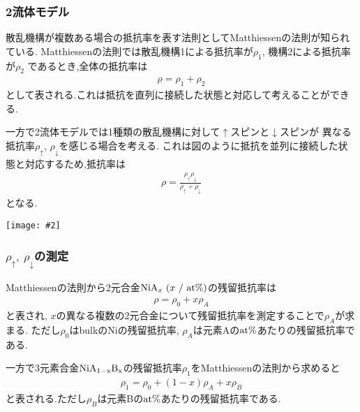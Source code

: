 \documentclass[uplatex,a4j,11pt,dvipdfmx]{jsarticle}
\makeatletter
\def\fgcaption{\def\@captype{figure}\caption}
\newcommand{\mfig}[3][width=15cm]{
\begin{center}
\texttt{[image: \#2]}
\fgcaption{#3 \label{fig:#2}}
\end{center}
}
\makeatother
\begin{document}
\subsubsection*{2流体モデル}
散乱機構が複数ある場合の抵抗率を表す法則としてMatthiessenの法則が知られている.
Matthiessenの法則では散乱機構1による抵抗率が$\rho_1$, 機構2による抵抗率が$\rho_2$
であるとき,全体の抵抗率は
\begin{align}
  \rho=\rho_1+\rho_2
\end{align}
として表される.これは抵抗を直列に接続した状態と対応して考えることができる.

一方で2流体モデルでは1種類の散乱機構に対して$\uparrow$スピンと$\downarrow$スピンが
異なる抵抗率$\rho_\uparrow$, $\rho_\downarrow$を感じる場合を考える.
これは図のように抵抗を並列に接続した状態と対応するため,抵抗率は
\begin{align}
  \rho=\frac{\rho_\uparrow\rho_\downarrow}{\rho_\uparrow+\rho_\downarrow}
\end{align}
となる.\cite{kiso}
\mfig[width=8cm]{fig/2cm.png}{Matthiessenの法則(左), 2流体モデル(右)の模式図}
\subsubsection*{$\rho_{\uparrow},\ \rho_{\downarrow}$の測定}
Matthiessenの法則から2元合金${\rm NiA}_x\ (x\ /\ {\rm at\%})$の残留抵抗率は
\begin{align}
  \rho=\rho_0+x\rho_A
\end{align}
と表され,
$x$の異なる複数の2元合金について残留抵抗率を測定することで$\rho_A$が求まる.
ただし$\rho_0$はbulkのNiの残留抵抗率,
$\rho_A$は元素Aの${\rm at\%}$あたりの残留抵抗率である.

一方で3元素合金${\rm NiA_{1-x}B_x}$の残留抵抗率$\rho_1$をMatthiessenの法則から求めると
\begin{align}
  \rho_1=\rho_0+(1-x)\rho_A+x\rho_B
\end{align}
と表される.ただし$\rho_B$は元素Bの${\rm at\%}$あたりの残留抵抗率である.
\end{document}
